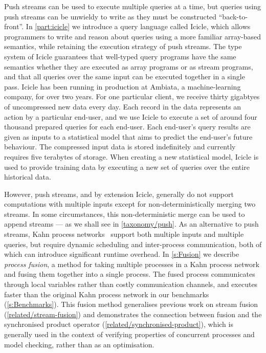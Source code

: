 Push streams can be used to execute multiple queries at a time, but queries using push streams can be unwieldy to write as they must be constructed ``back-to-front''.
In \cref{part:icicle} we introduce a query language called Icicle, which allows programmers to write and reason about queries using a more familiar array-based semantics, while retaining the execution strategy of push streams.
The type system of Icicle guarantees that well-typed query programs have the same semantics whether they are executed as array programs or as stream programs, and that all queries over the same input can be executed together in a single pass.
Icicle has been running in production at Ambiata, a machine-learning company, for over two years.
For one particular client, we receive thirty gigabtyes of uncompressed new data every day.
Each record in the data represents an action by a particular end-user, and we use Icicle to execute a set of around four thousand prepared queries for each end-user.
Each end-user's query results are given as inputs to a statistical model that aims to predict the end-user's future behaviour.
The compressed input data is stored indefinitely and currently requires five terabytes of storage.
When creating a new statistical model, Icicle is used to provide training data by executing a new set of queries over the entire historical data.

However, push streams, and by extension Icicle, generally do not support computations with multiple inputs except for non-deterministically merging two streams.
In some circumstances, this non-deterministic merge can be used to append streams --- as we shall see in \cref{taxonomy/push}.
As an alternative to push streams, Kahn process networks~\citep{kahn1976coroutines} support both multiple inputs and multiple queries, but require dynamic scheduling and inter-process communication, both of which can introduce significant runtime overhead.
In \cref{s:Fusion} we describe \emph{process fusion}, a method for taking multiple processes in a Kahn process network and fusing them together into a single process.
The fused process communicates through local variables rather than costly communication channels, and executes faster than the original Kahn process network in our benchmarks (\cref{s:Benchmarks}).
This fusion method generalises previous work on stream fusion (\cref{related/stream-fusion}) and demonstrates the connection between fusion and the synchronised product operator (\cref{related/synchronised-product}), which is generally used in the context of verifying properties of concurrent processes and model checking, rather than as an optimisation.

